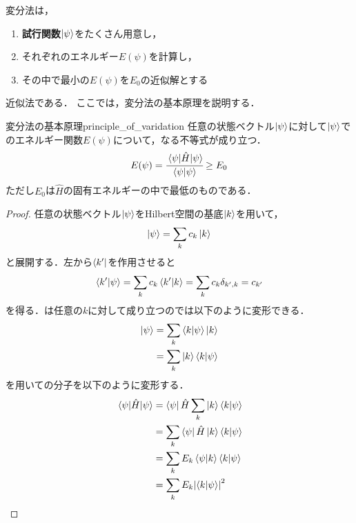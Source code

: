 \documentclass{report}
\begin{document}
  変分法は，
  \begin{screen}
    \begin{enumerate}
      \item \textbf{試行関数}$\ket{\psi}$をたくさん用意し，
      \item それぞれのエネルギー$E(\psi)$を計算し，
      \item その中で最小の$E(\psi)$を$E_0$の近似解とする
    \end{enumerate}
  \end{screen}
  近似法である．
  ここでは，変分法の基本原理を説明する．
  \begin{myprop}{変分法の基本原理}{principle_of_varidation}
    任意の状態ベクトル$\ket{\psi}$に対して$\ket{\psi}$でのエネルギー関数$E(\psi)$について，なる不等式が成り立つ．
    \begin{align}
      E(\psi) = \cfrac{\mel{\psi}{\hat{H}}{\psi}}{\braket{\psi}} \geq E_0 \label{minimum}
    \end{align}
    ただし$E_0$は$\hat{H}$の固有エネルギーの中で最低のものである．
    \tcblower
    \begin{proof}
      任意の状態ベクトル$\ket{\psi}$をHilbert空間の基底$\ket{k}$を用いて，
      \begin{align}
        \ket{\psi} = \sum_{k} c_k\ket{k} \label{basis_expansion}
      \end{align}
      と展開する．左から$\bra{k'}$を作用させると
      \begin{align}
        \braket{k'}{\psi} = \sum_{k}c_k\bra{k'}\ket{k} = \sum_{k}c_k\delta_{k',k} = c_{k'} \label{basis_expansion2}
      \end{align}
      を得る．は任意の$k$に対して成り立つのでは以下のように変形できる．
      \begin{align}
        \ket{\psi} &= \sum_{k}\braket{k}{\psi}\ket{k}\\
        &= \sum_{k}\ket{k}\bra{k}\ket{\psi} \label{basis_expansion3}
      \end{align}
      を用いての分子を以下のように変形する．
      \begin{align}
        \mel{\psi}{\hat{H}}{{\psi}} &= \bra{\psi}\hat{H}\sum_{k}\ket{k}\braket{k}{\psi}\\
        &= \sum_{k}\bra{\psi}\hat{H}\ket{k}\braket{k}{\psi} \\
        &= \sum_{k}E_k\bra{\psi}\ket{k}\braket{k}{\psi} \\
        &= \sum_{k}E_k\abs{\braket{k}{\psi}}^2

\end{align}
\end{proof}
\end{myprop}
\end{document}
